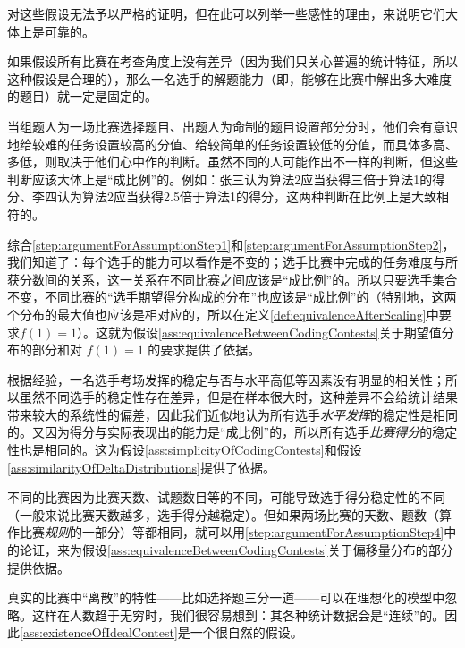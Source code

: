         对这些假设无法予以严格的证明，但在此可以列举一些感性的理由，来说明它们大体上是可靠的。

        \begin{asparaenum}
            \item \label{step:argumentForAssumptionStep1} 如果假设所有比赛在考查角度上没有差异（因为我们只关心普遍的统计特征，所以这种假设是合理的），那么一名选手的解题能力（即，能够在比赛中解出多大难度的题目）就一定是固定的。
            \item \label{step:argumentForAssumptionStep2} 当组题人为一场比赛选择题目、出题人为命制的题目设置部分分时，他们会有意识地给较难的任务设置较高的分值、给较简单的任务设置较低的分值，而具体多高、多低，则取决于他们心中作的判断。虽然不同的人可能作出不一样的判断，但这些判断应该大体上是“成比例”的。例如：张三认为算法2应当获得三倍于算法1的得分、李四认为算法2应当获得2.5倍于算法1的得分，这两种判断在比例上是大致相符的。
            \item 综合\ref{step:argumentForAssumptionStep1}和\ref{step:argumentForAssumptionStep2}，我们知道了：每个选手的能力可以看作是不变的；选手比赛中完成的任务难度与所获分数间的关系，这一关系在不同比赛之间应该是“成比例”的。所以只要选手集合不变，不同比赛的“选手期望得分构成的分布”也应该是“成比例”的（特别地，这两个分布的最大值也应该是相对应的，所以在定义\ref{def:equivalenceAfterScaling}中要求$f(1)=1$）。这就为假设\ref{ass:equivalenceBetweenCodingContests}关于期望值分布的部分和对 $f(1)=1$ 的要求提供了依据。
            \item \label{step:argumentForAssumptionStep4} 根据经验，一名选手考场发挥的稳定与否与水平高低等因素没有明显的相关性；所以虽然不同选手的稳定性存在差异，但是在样本很大时，这种差异不会给统计结果带来较大的系统性的偏差，因此我们近似地认为所有选手\emph{水平发挥}的稳定性是相同的。又因为得分与实际表现出的能力是“成比例”的，所以所有选手\emph{比赛得分}的稳定性也是相同的。这为假设\ref{ass:simplicityOfCodingContests}和假设\ref{ass:similarityOfDeltaDistributions}提供了依据。
            \item 不同的比赛因为比赛天数、试题数目等的不同，可能导致选手得分稳定性的不同（一般来说比赛天数越多，选手得分越稳定）。但如果两场比赛的天数、题数（算作比赛\emph{规则}的一部分）等都相同，就可以用\ref{step:argumentForAssumptionStep4}中的论证，来为假设\ref{ass:equivalenceBetweenCodingContests}关于偏移量分布的部分提供依据。
            \item 真实的比赛中“离散”的特性——比如选择题三分一道——可以在理想化的模型中忽略。这样在人数趋于无穷时，我们很容易想到：其各种统计数据会是“连续”的。因此\ref{ass:existenceOfIdealContest}是一个很自然的假设。

\end{asparaenum}
